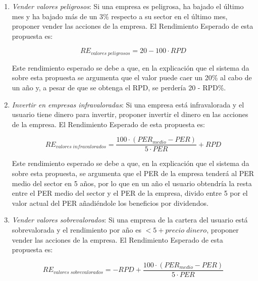 \documentclass[11pt,openany]{book} %
\begin{document}
\begin{enumerate}[\qquad\color{ocre}{$\bullet$}]
    \item \textit{\textcolor{ocre}{Vender valores peligrosos}}: Si una empresa es peligrosa, ha bajado el último mes y ha bajado más de un 3\% respecto a su sector en el último mes, proponer vender las acciones de la empresa. El Rendimiento Esperado de esta propuesta es:

    \begin{theorem}
        \begin{displaymath}
            RE_{valores\;peligrosos} = 20 - 100 \cdot RPD
        \end{displaymath}
    \end{theorem}

    Este rendimiento esperado se debe a que, en la explicación que el sistema da sobre esta propuesta se argumenta que el valor puede caer un 20\% al cabo de un año y, a pesar de que se obtenga el RPD, se perdería 20 - RPD\%.

    \item \textit{\textcolor{ocre}{Invertir en empresas infravaloradas}}: Si una empresa está infravalorada y el usuario tiene dinero para invertir, proponer invertir el dinero en las acciones de la empresa. El Rendimiento Esperado de esta propuesta es:

    \begin{theorem}
        \begin{displaymath}
            RE_{valores\;infravalorados} = \frac{100 \cdot (PER_{medio} - PER)}{5 \cdot PER} + RPD
        \end{displaymath}
    \end{theorem}

    Este rendimiento esperado se debe a que, en la explicación que el sistema da sobre esta propuesta, se argumenta que el PER de la empresa tenderá al PER medio del sector en 5 años, por lo que en un año el usuario obtendría la resta entre el PER medio del sector y el PER de la empresa, divido entre 5 por el valor actual del PER añadiéndole los beneficios por dividendos.

    \item \textit{\textcolor{ocre}{Vender valores sobrevalorados}}: Si una empresa de la cartera del usuario está sobrevalorada y el rendimiento por año es $< 5 + precio\;dinero$, proponer vender las acciones de la empresa. El Rendimiento Esperado de esta propuesta es:

    \begin{theorem}
        \begin{displaymath}
            RE_{valores\;sobrevalorados} = -RPD + \frac{100 \cdot (PER_{medio} - PER)}{5 \cdot PER}
        \end{displaymath}
    \end{theorem}


\end{enumerate}
\end{document}
